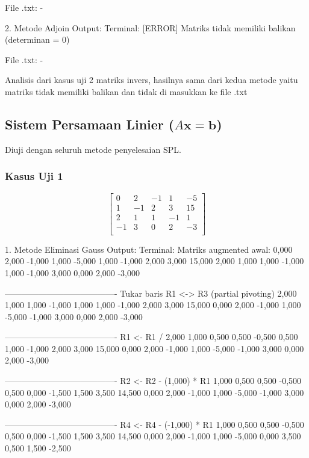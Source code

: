 \documentclass[12pt]{article}
\begin{document}
\begin{enumerate}
\begin{keluaran}
File .txt:
-

2. Metode Adjoin
Output:
Terminal:
[ERROR] Matriks tidak memiliki balikan (determinan = 0)

File .txt:
-
\end{keluaran}
Analisis dari kasus uji 2 matriks invers, hasilnya sama dari kedua metode yaitu matriks tidak memiliki balikan dan tidak di masukkan ke file .txt

\subsection{Sistem Persamaan Linier (\texorpdfstring{$A\mathbf{x} = \mathbf{b}$}{Ax = b})}
Diuji dengan seluruh metode penyelesaian SPL.
\subsubsection{Kasus Uji 1}
\begin{equation}
    \begin{bmatrix}
        0 & 2 & -1 & 1 & -5 \\
        1 & -1 & 2 & 3 & 15 \\
        2 & 1 & 1 & -1 & 1 \\
        -1 & 3 & 0 & 2 & -3 \\
    \end{bmatrix}
\end{equation}
\begin{keluaran}
1. Metode Eliminasi Gauss
Output:
Terminal:
Matriks augmented awal:
0,000   2,000   -1,000  1,000   -5,000
1,000   -1,000  2,000   3,000   15,000
2,000   1,000   1,000   -1,000  1,000
-1,000  3,000   0,000   2,000   -3,000

----------------------------------------
Tukar baris R1 <-> R3 (partial pivoting)
2,000   1,000   1,000   -1,000  1,000
1,000   -1,000  2,000   3,000   15,000
0,000   2,000   -1,000  1,000   -5,000
-1,000  3,000   0,000   2,000   -3,000

----------------------------------------
R1 <- R1 / 2,000
1,000   0,500   0,500   -0,500  0,500
1,000   -1,000  2,000   3,000   15,000
0,000   2,000   -1,000  1,000   -5,000
-1,000  3,000   0,000   2,000   -3,000

----------------------------------------
R2 <- R2 - (1,000) * R1
1,000   0,500   0,500   -0,500  0,500
0,000   -1,500  1,500   3,500   14,500
0,000   2,000   -1,000  1,000   -5,000
-1,000  3,000   0,000   2,000   -3,000

----------------------------------------
R4 <- R4 - (-1,000) * R1
1,000   0,500   0,500   -0,500  0,500
0,000   -1,500  1,500   3,500   14,500
0,000   2,000   -1,000  1,000   -5,000
0,000   3,500   0,500   1,500   -2,500


\end{keluaran}
\end{enumerate}
\end{document}
